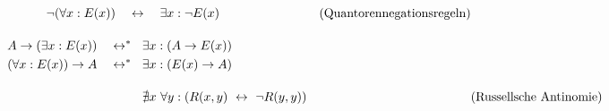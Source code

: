 \begin{align*}
\begin{split}
        \neg (\forall x: E(x)) \quad & \leftrightarrow\quad \exists x: \neg E(x) %
    \end{split} && (\text{Quantorennegationsregeln}) \\[1em]
    \begin{split}
        A \to( \exists x : E(x)) \quad & \leftrightarrow^*\quad\hspace{-.4em} \exists x : ( A\to E(x)) \\ %
        (\forall x : E(x)) \to A \quad & \leftrightarrow^*\quad\hspace{-.4em} \exists x : (E(x) \to A) %
    \end{split} \\[1em]
    \nexists x\ \forall y : (R(x,y) \ &\leftrightarrow\ \neg R(y,y)) && (\text{Russellsche Antinomie})
\end{align*}
\endgroup





